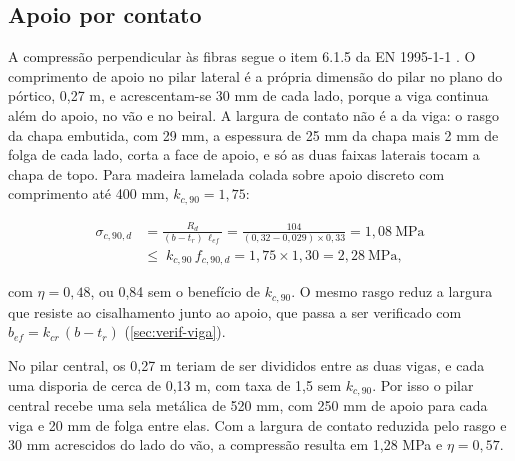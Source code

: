 \subsection{Apoio por contato}\label{ssec:apoio-contato}

A compressão perpendicular às fibras segue o item 6.1.5 da
EN 1995-1-1 \cite{EN1995-1-1:2004}. O comprimento de apoio no pilar lateral é a
própria dimensão do pilar no plano do pórtico, 0,27 m, e acrescentam-se 30 mm de
cada lado, porque a viga continua além do apoio, no vão e no beiral. A largura
de contato não é a da viga: o rasgo da chapa embutida, com 29 mm, a espessura de
25 mm da chapa mais 2 mm de folga de cada lado, corta a face de apoio, e só as
duas faixas laterais tocam a chapa de topo. Para madeira lamelada colada sobre
apoio discreto com comprimento até 400 mm, $k_{c,90} = 1{,}75$:

\begin{equation}
    \begin{aligned}
    \sigma_{c,90,d} &= \frac{R_d}{(b - t_r)\,\ell_{ef}}
    = \frac{104}{(0{,}32 - 0{,}029) \times 0{,}33} = 1{,}08~\text{MPa} \\
    &\leq\; k_{c,90}\,f_{c,90,d} = 1{,}75 \times 1{,}30 = 2{,}28~\text{MPa},
    \end{aligned}
    \label{eq:apoio-l1}
\end{equation}

\noindent
com $\eta = 0{,}48$, ou 0,84 sem o benefício de $k_{c,90}$. O mesmo rasgo reduz a
largura que resiste ao cisalhamento junto ao apoio, que passa a ser verificado
com $b_{ef} = k_{cr}\,(b - t_r)$ (\autoref{sec:verif-viga}).

No pilar central, os 0,27 m teriam de ser divididos entre as duas vigas, e cada
uma disporia de cerca de 0,13 m, com taxa de 1,5 sem $k_{c,90}$. Por isso o
pilar central recebe uma sela metálica de 520 mm, com 250 mm de apoio para cada
viga e 20 mm de folga entre elas. Com a largura de contato reduzida pelo rasgo e
30 mm acrescidos do lado do vão, a compressão resulta em 1,28 MPa e
$\eta = 0{,}57$.


